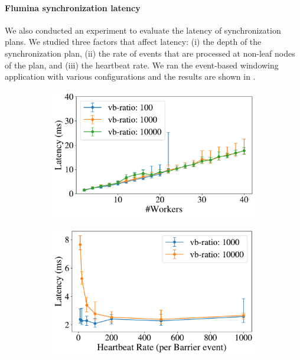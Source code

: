 \paragraph{Flumina synchronization latency}
\label{ssec:latency-eval}
We also conducted an experiment to evaluate the latency of synchronization plans. We studied three factors that affect latency: (i) the depth of the synchronization plan, (ii) the rate of events that are processed at non-leaf nodes of the plan, and (iii) the heartbeat rate. We ran the event-based windowing application with various configurations and the results are shown in .
\begin{figure}[t]
    \centering
    \begin{subfigure}[t]{0.45\columnwidth}
      \includegraphics[width=\textwidth]{figures/dgs/synchronization_cost_ratios_nodes}
    \end{subfigure}
    \begin{subfigure}[t]{0.45\columnwidth}
      \includegraphics[width=\textwidth]{figures/dgs/synchronization_cost_heartbeats_ratios}

\end{subfigure}
\end{figure}
